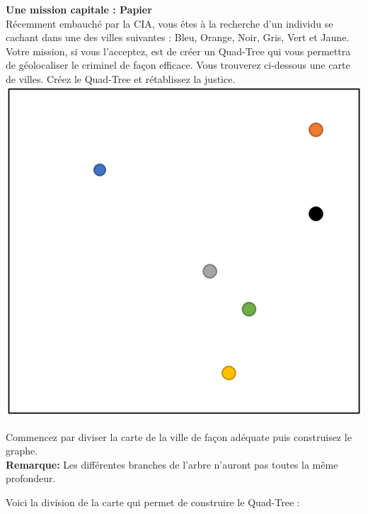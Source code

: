 \begin{Exercice}[10 minutes]\textbf{Une mission capitale : Papier \optionnel}\\

Récemment embauché par la CIA, vous êtes à la recherche d'un individu se cachant dans une des villes suivantes : Bleu, Orange, Noir, Gris, Vert et Jaune. Votre mission, si vous l'acceptez, est de créer un Quad-Tree qui vous permettra de géolocaliser le criminel de façon efficace. Vous trouverez ci-dessous une carte de villes. Créez le Quad-Tree et rétablissez la justice.\\

\includegraphics[]{Ressources/Quad-Tree 3.PNG}
\begin{conseil}
    Commencez par diviser la carte de la ville de façon adéquate puis construisez le graphe.\\
    
    \textbf{Remarque: }Les différentes branches de l'arbre n'auront pas toutes la même profondeur.
\end{conseil}
\begin{solution}
    Voici la division de la carte qui permet de construire le Quad-Tree :\\
    

\end{solution}
\end{Exercice}
